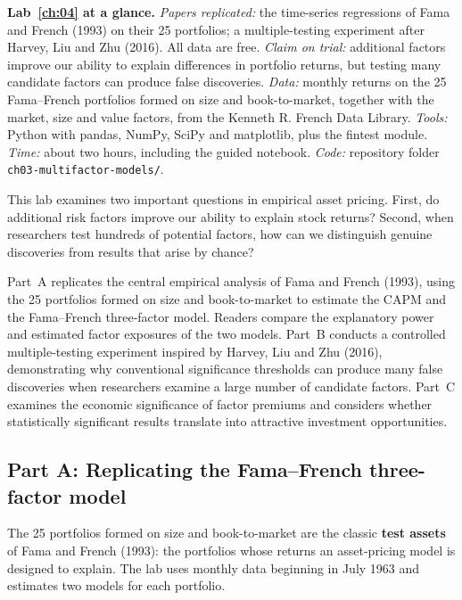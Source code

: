 \begin{callout}
\textbf{Lab~\ref{ch:04} at a glance.} \emph{Papers replicated:} the time-series regressions of Fama and French (1993) on their 25 portfolios; a multiple-testing experiment after Harvey, Liu and Zhu (2016). All data are free. \emph{Claim on trial:} additional factors improve our ability to explain differences in portfolio returns, but testing many candidate factors can produce false discoveries. \emph{Data:} monthly returns on the 25 Fama--French portfolios formed on size and book-to-market, together with the market, size and value factors, from the Kenneth R. French Data Library. \emph{Tools:} Python with pandas, NumPy, SciPy and matplotlib, plus the fintest module. \emph{Time:} about two hours, including the guided notebook. \emph{Code:} repository folder \texttt{ch03-multifactor-models/}.
\end{callout}

This lab examines two important questions in empirical asset pricing. First, do additional risk factors improve our ability to explain stock returns? Second, when researchers test hundreds of potential factors, how can we distinguish genuine discoveries from results that arise by chance?

Part~A replicates the central empirical analysis of Fama and French (1993), using the 25 portfolios formed on size and book-to-market to estimate the CAPM and the Fama--French three-factor model. Readers compare the explanatory power and estimated factor exposures of the two models. Part~B conducts a controlled multiple-testing experiment inspired by Harvey, Liu and Zhu (2016), demonstrating why conventional significance thresholds can produce many false discoveries when researchers examine a large number of candidate factors. Part~C examines the economic significance of factor premiums and considers whether statistically significant results translate into attractive investment opportunities.

\subsection*{Part A: Replicating the Fama--French three-factor model}

The 25 portfolios formed on size and book-to-market are the classic \textbf{test assets} of Fama and French (1993): the portfolios whose returns an asset-pricing model is designed to explain. The lab uses monthly data beginning in July 1963 and estimates two models for each portfolio.

